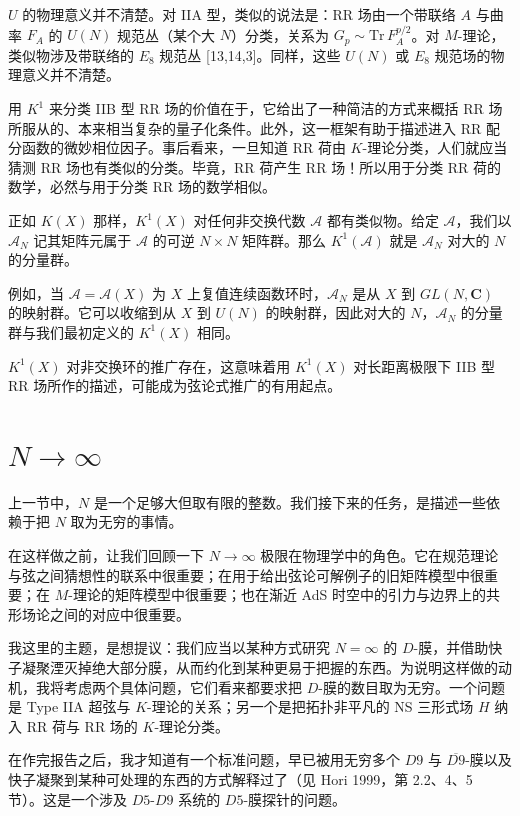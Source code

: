 \(U\) 的物理意义并不清楚。对 IIA 型，类似的说法是：RR 场由一个带联络 \(A\) 与曲率 \(F_A\) 的 \(U(N)\) 规范丛（某个大 \(N\)）分类，关系为 \(G_p\sim \mathrm{Tr}\,F_A^{p/2}\)。对 \(M\)-理论，类似物涉及带联络的 \(E_8\) 规范丛 [13,14,3]。同样，这些 \(U(N)\) 或 \(E_8\) 规范场的物理意义并不清楚。

用 \(K^1\) 来分类 IIB 型 RR 场的价值在于，它给出了一种简洁的方式来概括 RR 场所服从的、本来相当复杂的量子化条件。此外，这一框架有助于描述进入 RR 配分函数的微妙相位因子。事后看来，一旦知道 RR 荷由 \(K\)-理论分类，人们就应当猜测 RR 场也有类似的分类。毕竟，RR 荷产生 RR 场！所以用于分类 RR 荷的数学，必然与用于分类 RR 场的数学相似。

正如 \(K(X)\) 那样，\(K^1(X)\) 对任何非交换代数 \(\mathcal{A}\) 都有类似物。给定 \(\mathcal{A}\)，我们以 \(\mathcal{A}_N\) 记其矩阵元属于 \(\mathcal{A}\) 的可逆 \(N\times N\) 矩阵群。那么 \(K^1(\mathcal{A})\) 就是 \(\mathcal{A}_N\) 对大的 \(N\) 的分量群。

例如，当 \(\mathcal{A}=\mathcal{A}(X)\) 为 \(X\) 上复值连续函数环时，\(\mathcal{A}_N\) 是从 \(X\) 到 \(GL(N,{\mathbf C})\) 的映射群。它可以收缩到从 \(X\) 到 \(U(N)\) 的映射群，因此对大的 \(N\)，\(\mathcal{A}_N\) 的分量群与我们最初定义的 \(K^1(X)\) 相同。

\(K^1(X)\) 对非交换环的推广存在，这意味着用 \(K^1(X)\) 对长距离极限下 IIB 型 RR 场所作的描述，可能成为弦论式推广的有用起点。

\section{\texorpdfstring{\(N\to\infty\)}{N 趋于无穷}}

上一节中，\(N\) 是一个足够大但取有限的整数。我们接下来的任务，是描述一些依赖于把 \(N\) 取为无穷的事情。

在这样做之前，让我们回顾一下 \(N\to\infty\) 极限在物理学中的角色。它在规范理论与弦之间猜想性的联系中很重要；在用于给出弦论可解例子的旧矩阵模型中很重要；在 \(M\)-理论的矩阵模型中很重要；也在渐近 AdS 时空中的引力与边界上的共形场论之间的对应中很重要。

我这里的主题，是想提议：我们应当以某种方式研究 \(N=\infty\) 的 \(D\)-膜，并借助快子凝聚湮灭掉绝大部分膜，从而约化到某种更易于把握的东西。为说明这样做的动机，我将考虑两个具体问题，它们看来都要求把 \(D\)-膜的数目取为无穷。一个问题是 Type IIA 超弦与 \(K\)-理论的关系；另一个是把拓扑非平凡的 NS 三形式场 \(H\) 纳入 RR 荷与 RR 场的 \(K\)-理论分类。

在作完报告之后，我才知道有一个标准问题，早已被用无穷多个 \(D9\) 与 \(\overline{D9}\)-膜以及快子凝聚到某种可处理的东西的方式解释过了（见 Hori 1999，第 2.2、4、5 节）。这是一个涉及 \(D5\)-\(D9\) 系统的 \(D5\)-膜探针的问题。

